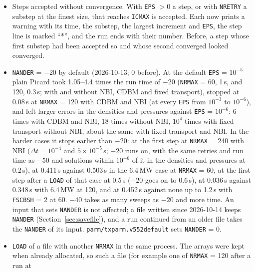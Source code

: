 \documentclass[11pt]{article}
\begin{document}
\begin{itemize}
  the variable that then took the status of the allocation; in a process whose arrays were already
  allocated the status was not set, so such a file freed every array and stopped the program.  The
  flag is now read apart, and \texttt{LOAD} clears it as before: a \texttt{LOAD} in the same process
  gives the state it gives in a new process.
\item Steps accepted without convergence.  With \texttt{EPS} $> 0$ a step, or with \texttt{NRETRY} a
  substep at the finest size, that reaches \texttt{ICMAX} is accepted.  Each now prints a warning
  with its time, the substep, the largest increment and \texttt{EPS}, the step line is marked
  ``*'', and the run ends with their number.  Before, a step whose first substep had been accepted
  so and whose second converged looked converged.
\item \texttt{NANDER} = $-20$ by default (2026-10-13; 0 before).  At the default \texttt{EPS} =
  $10^{-5}$ plain Picard took 1.05--4.4 times the run time of $-20$ (\texttt{NRMAX} = 60, 1\,s, and 120,
  0.3\,s; with and without NBI, CDBM and fixed transport), stopped at 0.08\,s at \texttt{NRMAX} = 120
  with CDBM and NBI (at every \texttt{EPS} from $10^{-3}$ to $10^{-6}$), and left larger errors in
  the densities and pressures against \texttt{EPS} = $10^{-6}$: 6 times with CDBM and NBI, 18 times
  without NBI, $10^4$ times with fixed transport without NBI, about the same with fixed transport and
  NBI.  In the harder cases it stops earlier than $-20$:
  at the first step at \texttt{NRMAX} = 240 with NBI ($\Delta t = 10^{-4}$ and $5\times10^{-5}$\,s; $-20$
  runs on, with the same retries and run time as $-50$ and solutions within $10^{-6}$ of it in the
  densities and pressures at 0.2\,s), at 0.411\,s against 0.503\,s in the 6.4\,MW case at
  \texttt{NRMAX} = 60, at the first step after a \texttt{LOAD} of that case at 0.5\,s ($-20$ goes on to
  0.6\,s), at 0.036\,s against 0.348\,s with 6.4\,MW at 120, and at 0.452\,s against none up to
  1.2\,s with \texttt{FSCBSH} = 2 at 60.
  $-40$ takes as many sweeps as $-20$ and more time.  An input that sets \texttt{NANDER} is not
  affected; a file written since 2026-10-14 keeps \texttt{NANDER} (Section~\ref{sec:savefile}), and a
  run continued from an older file takes the \texttt{NANDER} of its input.  \texttt{parm/txparm.v552default} sets \texttt{NANDER} = 0.
\item \texttt{LOAD} of a file with another \texttt{NRMAX} in the same process.  The arrays were
  kept when already allocated, so such a file (for example one of \texttt{NRMAX} = 120 after a run at

\end{itemize}
\end{document}
